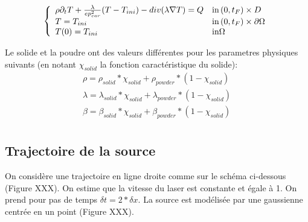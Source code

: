 \documentclass[11pt,a4paper]{article}
\begin{document}
\begin{equation}
\label{eq:heatEq}
\left\{\begin{array}{ll}
\rho\partial_t T+\frac{\lambda}{ep_{car}^2}(T-T_{ini}) -div(\lambda\nabla T)=Q & \textrm{in\,}(0,t_F)\times D \\
T=T_{ini} & \textrm{in\,}(0,t_F)\times \partial\Omega \\
T(0)=T_{ini} & \textrm{in} \Omega
\end{array}\right.
\end{equation}

Le solide et la poudre ont des valeurs différentes pour les parametres physiques suivants (en notant $\chi_{solid}$ la fonction caractéristique du solide):
\begin{equation}
\begin{aligned}
\rho=\rho_{solid}*\chi_{solid}+\rho_{powder}*(1-\chi_{solid}) \\
\lambda=\lambda_{solid}*\chi_{solid}+\lambda_{powder}*(1-\chi_{solid}) \\
\beta=\beta_{solid}*\chi_{solid}+\beta_{powder}*(1-\chi_{solid}) \\
\end{aligned}
\end{equation}

\subsection*{Trajectoire de la source}
On considère une trajectoire en ligne droite comme sur le schéma ci-dessous (Figure XXX). On estime que la vitesse du laser est constante et égale à 1. On prend pour pas de temps $\delta t=2*\delta x$. La source est modélisée par une gaussienne centrée en un point (Figure XXX). 


\end{document}
